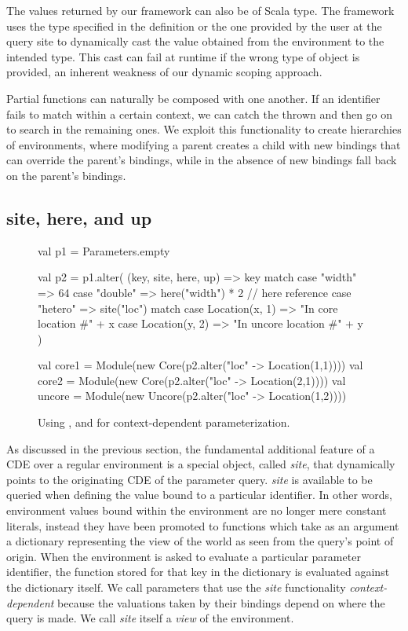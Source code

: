 The values returned by our framework can also be of  Scala type.
The framework uses the type specified in the  definition 
or the one provided by the user at the query site
to dynamically cast the value obtained from the environment to the intended type.
This cast can fail at runtime if the wrong type of object is provided, an inherent weakness of our dynamic scoping approach.

Partial functions can naturally be composed with one another. If an identifier fails to match
within a certain context, we can catch the  thrown and then go on to search
in the remaining ones.
We exploit this functionality to create hierarchies of environments,
where modifying a parent creates a child with new bindings that can override the parent's bindings,
while in the absence of new bindings fall back on the parent's bindings.

\subsection{site, here, and up}

\begin{figure}
\centering
\begin{scala}
val p1 = Parameters.empty

val p2 = p1.alter(
  (key, site, here, up) => key match { 
    case "width" => 64
    case "double" => here("width") * 2  // here reference
    case "hetero" => site("loc") match {
      case Location(x, 1) => "In core location #" + x
      case Location(y, 2) => "In uncore location #" + y
    }
  }
) 

val core1 = Module(new Core(p2.alter("loc" -> Location(1,1))))
val core2 = Module(new Core(p2.alter("loc" -> Location(2,1))))
val uncore = Module(new Uncore(p2.alter("loc" -> Location(1,2))))

\end{scala} 
\caption{Using ,  and   for context-dependent parameterization.}
\label{fig:site}
\end{figure}

As discussed in the previous section, the fundamental additional feature of a CDE over a regular environment is a special object,
called \emph{site}, that dynamically points to the originating CDE of the parameter query.
\emph{site} is available to be queried when defining the value bound to a particular identifier.
In other words, environment values bound within the environment are no longer mere constant literals, instead
they have been promoted to functions which take as an argument a dictionary representing the view of the world as seen from the query's point of origin.
When the environment is asked to evaluate a particular parameter identifier, the function stored for that key in the dictionary is evaluated against the dictionary itself.
We call parameters that use the \emph{site} functionality {\em context-dependent} because the valuations taken by their bindings depend on where the query is made.
We call \emph{site} itself a \emph{view} of the environment.

